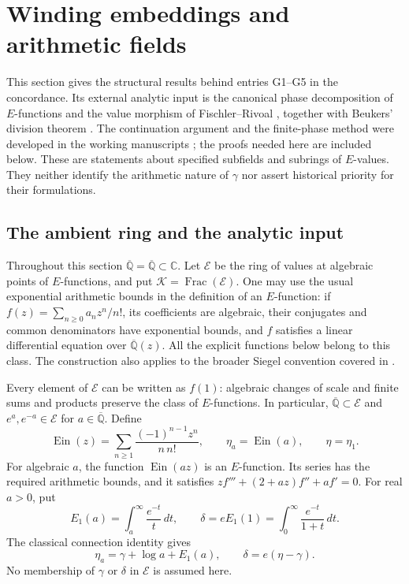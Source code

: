 \documentclass[11pt,a4paper]{article}
\numberwithin{equation}{section}
\theoremstyle{definition}
\theoremstyle{remark}
\newcommand{\A}{\overline{\mathbb Q}}
\newcommand{\Er}{\mathcal E}
\newcommand{\K}{\mathcal K}
\newcommand{\Ein}{\operatorname{Ein}}
\newcommand{\Eone}{E_1}
\begin{document}
\section{Winding embeddings and arithmetic fields}
\label{gf:section}

This section gives the structural results behind entries G1--G5 in the
concordance.  Its external analytic input is the canonical phase
decomposition of $E$-functions and the value morphism of
Fischler--Rivoal \cite[Theorem~2.3 and Proposition~3.1]{FR2026}, together
with Beukers' division theorem \cite{Beukers2006}.  The continuation
argument and the finite-phase method were developed in the working
manuscripts \cite{VMRC030,VMRC033,VMRC049}; the proofs needed here are
included below.  These are statements about specified subfields and
subrings of $E$-values.  They neither identify the arithmetic nature of
$\gamma$ nor assert historical priority for their formulations.

\subsection{The ambient ring and the analytic input}
\label{gf:ambient}

Throughout this section $\A=\overline{\mathbb Q}\subset\mathbb C$.
Let $\Er$ be the ring of values at algebraic points of $E$-functions, and
put $\K=\operatorname{Frac}(\Er)$.  One may use the usual exponential
arithmetic bounds in the definition of an $E$-function: if
$f(z)=\sum_{n\ge0}a_nz^n/n!$, its coefficients are algebraic, their
conjugates and common denominators have exponential bounds, and $f$
satisfies a linear differential equation over $\A(z)$.  All the explicit
functions below belong to this class.  The construction also applies to
the broader Siegel convention covered in \cite{FR2026}.

Every element of $\Er$ can be written as $f(1)$: algebraic changes of
scale and finite sums and products preserve the class of $E$-functions.
In particular, $\A\subset\Er$ and $e^a,e^{-a}\in\Er$ for $a\in\A$.
Define
\begin{equation}\label{gf:Ein-def}
 \Ein(z)=\sum_{n\ge1}\frac{(-1)^{n-1}z^n}{n\,n!},
 \qquad \eta_a=\Ein(a),\qquad \eta=\eta_1.
\end{equation}
For algebraic $a$, the function $\Ein(az)$ is an $E$-function.  Its
series has the required arithmetic bounds, and it satisfies
$z f'''+(2+az)f''+af'=0$.
For real $a>0$, put
\[
 \Eone(a)=\int_a^\infty\frac{e^{-t}}{t}\,dt,
 \qquad \delta=e\Eone(1)=\int_0^\infty\frac{e^{-t}}{1+t}\,dt.
\]
The classical connection identity gives
\begin{equation}\label{gf:connection}
 \eta_a=\gamma+\log a+\Eone(a),
 \qquad \delta=e(\eta-\gamma).
\end{equation}
No membership of $\gamma$ or $\delta$ in $\Er$ is assumed here.
\end{document}
